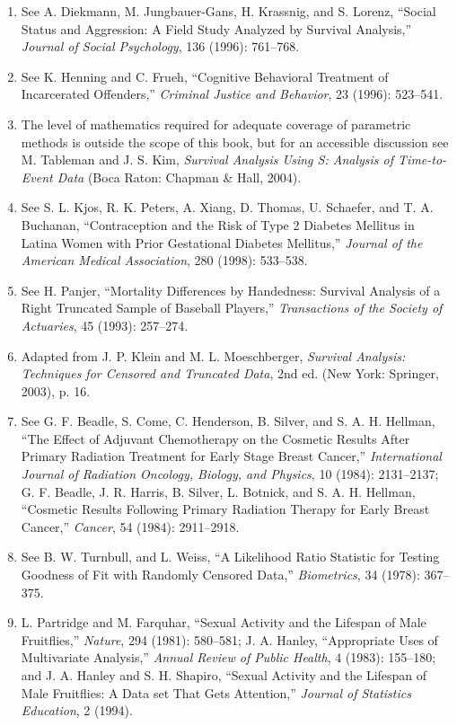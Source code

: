 \documentclass[
]{report}
\begin{document}
\begin{enumerate}
\item See A. Diekmann, M. Jungbauer-Gans, H. Krassnig, and S. Lorenz, “Social Status and Aggression: A Field Study Analyzed by Survival Analysis,” \textit{Journal of Social Psychology}, 136 (1996): 761–768.
\item See K. Henning and C. Frueh, “Cognitive Behavioral Treatment of Incarcerated Offenders,” \textit{Criminal Justice and Behavior}, 23 (1996): 523–541.
\item The level of mathematics required for adequate coverage of parametric methods is outside the scope of this book, but for an accessible discussion see M. Tableman and J. S. Kim, \textit{Survival Analysis Using S: Analysis of Time-to-Event Data} (Boca Raton: Chapman \& Hall, 2004).
\item See S. L. Kjos, R. K. Peters, A. Xiang, D. Thomas, U. Schaefer, and T. A. Buchanan, “Contraception and the Risk of Type 2 Diabetes Mellitus in Latina Women with Prior Gestational Diabetes Mellitus,” \textit{Journal of the American Medical Association}, 280 (1998): 533–538.
\item See H. Panjer, “Mortality Differences by Handedness: Survival Analysis of a Right Truncated Sample of Baseball Players,” \textit{Transactions of the Society of Actuaries}, 45 (1993): 257–274.
\item Adapted from J. P. Klein and M. L. Moeschberger, \textit{Survival Analysis: Techniques for Censored and Truncated Data}, 2nd ed. (New York: Springer, 2003), p. 16.
\item See G. F. Beadle, S. Come, C. Henderson, B. Silver, and S. A. H. Hellman, “The Effect of Adjuvant Chemotherapy on the Cosmetic Results After Primary Radiation Treatment for Early Stage Breast Cancer,” \textit{International Journal of Radiation Oncology, Biology, and Physics}, 10 (1984): 2131–2137; G. F. Beadle, J. R. Harris, B. Silver, L. Botnick, and S. A. H. Hellman, “Cosmetic Results Following Primary Radiation Therapy for Early Breast Cancer,” \textit{Cancer}, 54 (1984): 2911–2918.
\item See B. W. Turnbull, and L. Weiss, “A Likelihood Ratio Statistic for Testing Goodness of Fit with Randomly Censored Data,” \textit{Biometrics}, 34 (1978): 367–375.
\item L. Partridge and M. Farquhar, “Sexual Activity and the Lifespan of Male Fruitflies,” \textit{Nature}, 294 (1981): 580–581; J. A. Hanley, “Appropriate Uses of Multivariate Analysis,” \textit{Annual Review of Public Health}, 4 (1983): 155–180; and J. A. Hanley and S. H. Shapiro, “Sexual Activity and the Lifespan of Male Fruitflies: A Data set That Gets Attention,” \textit{Journal of Statistics Education}, 2 (1994).

\end{enumerate}
\end{document}

